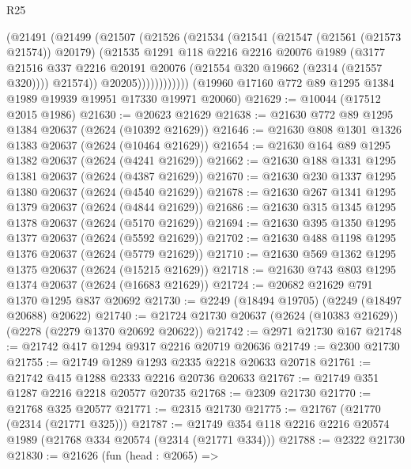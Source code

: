 \begin{lexlean}{R25}
\begin{coremodule}
                  (@21491
                    (@21499
                      (@21507
                        (@21526
                          (@21534
                            (@21541
                              (@21547 (@21561 (@21573 @21574)) @20179)
                              (@21535
                                @1291
                                @118
                                @2216
                                @2216
                                @20076
                                @1989
                                (@3177
                                  @21516
                                  @337
                                  @2216
                                  @20191
                                  @20076
                                  (@21554 @320 @19662 (@2314 (@21557 @320))))
                                @21574))
                            @20205))))))))))))
    (@19960 @17160 @772 @89 @1295 @1384 @1989 @19939 @19951 @17330 @19971 @20060)
@21629 := @10044 (@17512 @2015 @1986)
@21630 := @20623 @21629
@21638 := @21630 @772 @89 @1295 @1384 @20637 (@2624 (@10392 @21629))
@21646 := @21630 @808 @1301 @1326 @1383 @20637 (@2624 (@10464 @21629))
@21654 := @21630 @164 @89 @1295 @1382 @20637 (@2624 (@4241 @21629))
@21662 := @21630 @188 @1331 @1295 @1381 @20637 (@2624 (@4387 @21629))
@21670 := @21630 @230 @1337 @1295 @1380 @20637 (@2624 (@4540 @21629))
@21678 := @21630 @267 @1341 @1295 @1379 @20637 (@2624 (@4844 @21629))
@21686 := @21630 @315 @1345 @1295 @1378 @20637 (@2624 (@5170 @21629))
@21694 := @21630 @395 @1350 @1295 @1377 @20637 (@2624 (@5592 @21629))
@21702 := @21630 @488 @1198 @1295 @1376 @20637 (@2624 (@5779 @21629))
@21710 := @21630 @569 @1362 @1295 @1375 @20637 (@2624 (@15215 @21629))
@21718 := @21630 @743 @803 @1295 @1374 @20637 (@2624 (@16683 @21629))
@21724 := @20682 @21629 @791 @1370 @1295 @837 @20692
@21730 := @2249 (@18494 @19705) (@2249 (@18497 @20688) @20622)
@21740 := @21724 @21730 @20637 (@2624 (@10383 @21629)) (@2278 (@2279 @1370 @20692 @20622))
@21742 := @2971 @21730 @167
@21748 := @21742 @417 @1294 @9317 @2216 @20719 @20636
@21749 := @2300 @21730
@21755 := @21749 @1289 @1293 @2335 @2218 @20633 @20718
@21761 := @21742 @415 @1288 @2333 @2216 @20736 @20633
@21767 := @21749 @351 @1287 @2216 @2218 @20577 @20735
@21768 := @2309 @21730
@21770 := @21768 @325 @20577
@21771 := @2315 @21730
@21775 := @21767 (@21770 (@2314 (@21771 @325)))
@21787 := @21749 @354 @118 @2216 @2216 @20574 @1989 (@21768 @334 @20574 (@2314 (@21771 @334)))
@21788 := @2322 @21730
@21830 := @21626
    (fun (head : @2065) =>

\end{coremodule}
\end{lexlean}
